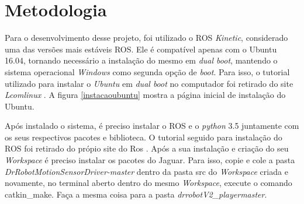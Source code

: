\chapter{Metodologia}
\label{chap:metodologia}

Para o desenvolvimento desse projeto, foi utilizado o ROS\textit{ Kinetic}, considerado uma das versões mais estáveis ROS. Ele é compatível apenas com o Ubuntu 16.04, tornando necessário a instalação do mesmo em \textit{dual boot}, mantendo o sistema operacional \textit{Windows} como segunda opção de \textit{boot}. Para isso, o tutorial utilizado para instalar o \textit{Ubuntu} em \textit{dual boot} no computador foi retirado do site \textit{Lcomlinux} \cite{ubuntu}. A figura \ref{instacaoubuntu} mostra a página inicial de instalação do Ubuntu.

	\begin{figure}[H]
		\centering
	\end{figure}
	
Após instalado o sistema, é preciso instalar o ROS e o \textit{python} 3.5 juntamente com os seus respectivos pacotes e biblioteca. O tutorial seguido para instalação do ROS foi retirado do própio site do Ros \cite{rosInstalacao}. Após a sua instalação e criação do seu \textit{Workspace} é preciso instalar os pacotes do Jaguar. Para isso, copie e cole a pasta \textit{DrRobotMotionSensorDriver-master} dentro da pasta src do \textit{Workspace} criada e novamente, no terminal aberto dentro do mesmo \textit{Workspace}, execute o comando catkin\_make. Faça a mesma coisa para a pasta \textit{drrobotV2\_player\-master}.


